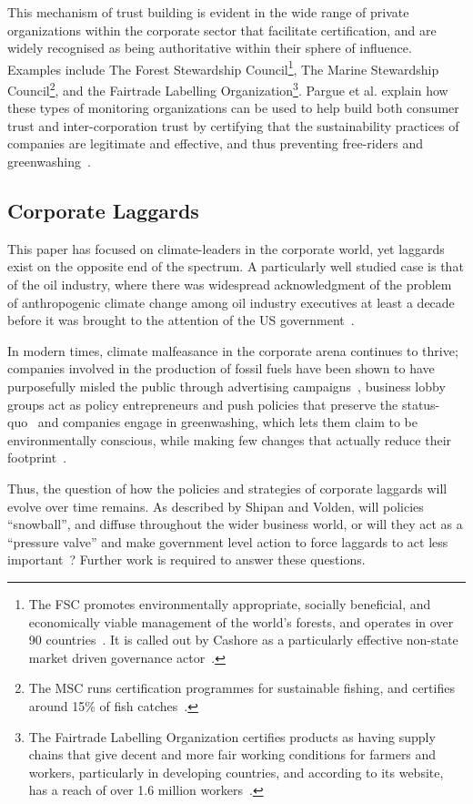 This mechanism of trust building is evident in the wide range of
private organizations within the corporate sector that facilitate
certification, and are widely recognised as being authoritative within
their sphere of influence. Examples include The Forest Stewardship
Council\footnote{The FSC promotes environmentally appropriate,
  socially beneficial, and economically viable management of the
  world’s forests, and operates in over 90 countries~\citep{fsc}. It
  is called out by Cashore as a particularly effective non-state
  market driven governance actor~\citep{cashore2002legitimacy}.}, The
Marine Stewardship Council\footnote{The MSC runs certification
  programmes for sustainable fishing, and certifies around 15\% of
  fish catches~\citep{msc, auld2013private}.}, and the Fairtrade
Labelling Organization\footnote{The Fairtrade Labelling Organization
  certifies products as having supply chains that give decent and more
  fair working conditions for farmers and workers, particularly in
  developing countries, and according to its website, has a reach of
  over 1.6 million workers~\citep{fairtrade,
    auld2013private}.}. Pargue et al. explain how these types of
monitoring organizations can be used to help build both consumer trust
and inter-corporation trust by certifying that the sustainability
practices of companies are legitimate and effective, and thus
preventing free-riders and
greenwashing~\citep{parguel2011sustainability}.

\subsection{Corporate Laggards}

This paper has focused on climate-leaders in the corporate world, yet
laggards exist on the opposite end of the spectrum. A particularly
well studied case is that of the oil industry, where there was
widespread acknowledgment of the problem of anthropogenic climate
change among oil industry executives at least a decade before it was
brought to the attention of the US government~\citep{franta2018early}.

In modern times, climate malfeasance in the corporate arena continues
to thrive; companies involved in the production of fossil fuels have
been shown to have purposefully misled the public through advertising
campaigns~\citep{supran2017assessing}, business lobby groups act as
policy entrepreneurs and push policies that preserve the
status-quo~\citep{goldenberg2013secret} and companies engage in
greenwashing, which lets them claim to be environmentally conscious,
while making few changes that actually reduce their
footprint~\citep{bruno1997world}.

Thus, the question of how the policies and strategies of corporate
laggards will evolve over time remains. As described by Shipan and
Volden, will policies ``snowball'', and diffuse throughout the wider
business world, or will they act as a ``pressure valve'' and make
government level action to force laggards to act less
important~\citep{shipan2012policy}?  Further work is required to answer
these questions.


